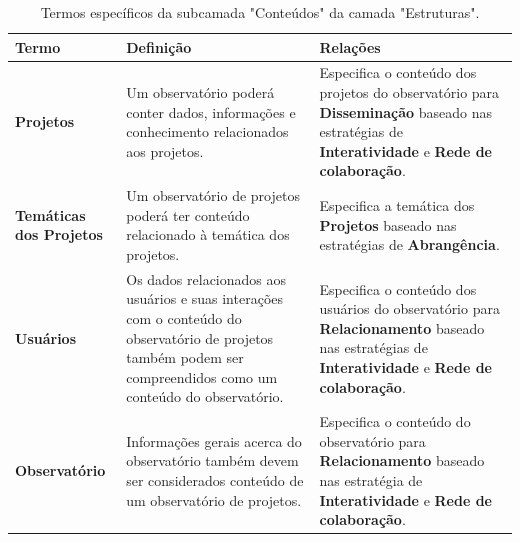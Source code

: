 \begin{apendicesenv}
\begin{table}[H]
\centering
\caption{Termos específicos da subcamada "Conteúdos" da camada "Estruturas".}
\begin{tabularx}{\textwidth}{|l|X|X|}
\hline
\textbf{Termo} & \textbf{Definição} & \textbf{Relações} \\ \hline
\textbf{Projetos}   & Um observatório poderá conter dados, informações e conhecimento relacionados aos projetos. & Especifica o conteúdo dos projetos do observatório para \textbf{Disseminação} baseado nas estratégias de \textbf{Interatividade} e \textbf{Rede de colaboração}.  \\ \hline
\textbf{Temáticas dos Projetos}  & Um observatório de projetos poderá ter conteúdo relacionado à temática dos projetos. & Especifica a temática dos \textbf{Projetos} baseado nas estratégias de \textbf{Abrangência}.\\ \hline
\textbf{Usuários}  & Os dados relacionados aos usuários e suas interações com o conteúdo do observatório de projetos também podem ser compreendidos como um conteúdo do observatório. & Especifica o conteúdo dos usuários do observatório para \textbf{Relacionamento} baseado nas estratégias de \textbf{Interatividade} e \textbf{Rede de colaboração}. \\ \hline
\textbf{Observatório}   & Informações gerais acerca do observatório também devem ser considerados conteúdo de um observatório de projetos. & Especifica o conteúdo do observatório para \textbf{Relacionamento} baseado nas estratégia de \textbf{Interatividade} e \textbf{Rede de colaboração}. \\ \hline
\end{tabularx}
\end{table}


\end{apendicesenv}

